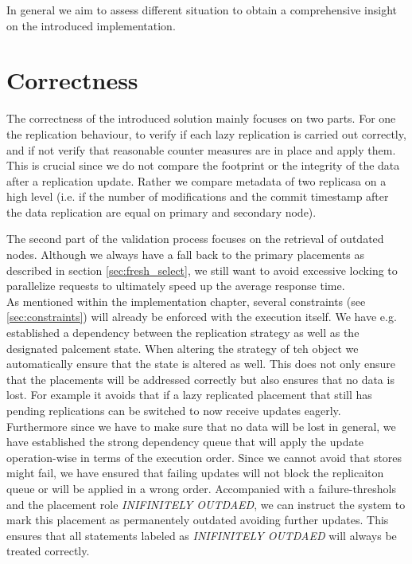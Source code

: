 In general we aim to assess different situation to obtain a comprehensive insight on the introduced implementation.


\section{Correctness}
\label{sec:correctness}


The correctness of the introduced solution mainly focuses on two parts. For one the replication behaviour, to verify if each lazy replication is carried out correctly,
and if not verify that reasonable counter measures are in place and apply them. This is crucial since we do not compare the footprint or the integrity of the data after 
a replication update. Rather we compare metadata of two replicasa on a high level 
(i.e. if the number of modifications and the commit timestamp after the data replication are equal on primary and secondary node). 

The second part of the validation process focuses on the retrieval of outdated nodes. Although we always have a fall back to the primary placements as described in 
section \ref{sec:fresh_select}, we still want to avoid excessive locking to parallelize requests to ultimately speed up the average response time.\\

As mentioned within the implementation chapter, several constraints (see \ref{sec:constraints}) will already be enforced with the execution itself. 
We have e.g. established a dependency between the replication strategy as well as the designated palcement state. When altering the strategy of teh object we
automatically ensure that the state is altered as well. This does not only ensure that the placements will be addressed correctly but also ensures that no data is lost.
For example it avoids that if a lazy replicated placement that still has pending replications can be switched to now receive updates eagerly.\\

Furthermore since we have to make sure that no data will be lost in general, we have established the strong dependency queue that will apply the update operation-wise in terms of the execution order.
Since we cannot avoid that stores might fail, we have ensured that failing updates will not block the replicaiton queue or will be applied in a wrong order.
Accompanied with a failure-threshols and the placement role \emph{INIFINITELY OUTDAED}, we can instruct the system to mark this placement as permanentely outdated 
avoiding further updates. 
This ensures that all statements labeled as \emph{INIFINITELY OUTDAED} will always be treated correctly.

